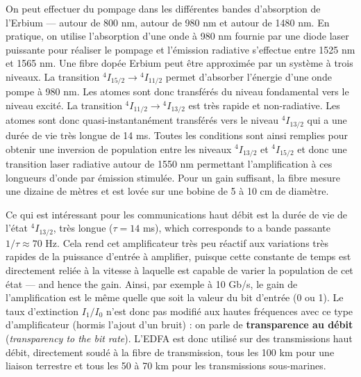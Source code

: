 \noindent On peut effectuer du pompage dans les différentes bandes
d'absorption de l'Erbium --- autour de 800 nm, autour de 980 nm et autour de
1480 nm. En pratique, on utilise l'absorption d'une onde à 980 nm fournie par
une diode laser puissante pour réaliser le pompage et l'émission radiative
s'effectue entre 1525 nm et 1565 nm. Une fibre dopée Erbium peut être
approximée par un système à trois niveaux. La transition
$^4I_{15/2}\to{}^4I_{11/2}$ permet d'absorber l'énergie d'une onde pompe à
980 nm. Les atomes sont donc transférés du niveau fondamental vers le niveau
excité. La transition $^4I_{11/2}\to{}^4I_{13/2}$ est très rapide et
non-radiative. Les atomes sont donc quasi-instantanément transférés vers le
niveau $^4I_{13/2}$ qui a une durée de vie très longue de 14 ms. Toutes les
conditions sont ainsi remplies pour obtenir une inversion de population entre
les niveaux $^4I_{13/2}$ et $^4I_{15/2}$ et donc une transition laser radiative
autour de 1550 nm permettant l'amplification à ces longueurs d'onde par
émission stimulée. Pour un gain suffisant, la fibre mesure une dizaine de
mètres et est lovée sur une bobine de 5 à 10 cm de diamètre.

\begin{conclusion}
  Ce qui est intéressant pour les communications haut débit est la durée de vie
  de l'état $^4I_{13/2}$, très longue ($\tau=14$ ms), which corresponds to a
  bande passante $1/\tau\approx 70$ Hz. Cela rend cet amplificateur très peu
  réactif aux variations très rapides de la puissance d'entrée à amplifier,
  puisque cette constante de temps est directement reliée à la vitesse à
  laquelle est capable de varier la population de cet état --- and hence the
  gain. Ainsi, par exemple à 10 Gb/s, le gain de l'amplification est le même
  quelle que soit la valeur du bit d'entrée (0 ou 1). Le taux d'extinction
  $I_1/I_0$ n'est donc pas modifié aux hautes fréquences avec ce type
  d'amplificateur (hormis l'ajout d'un bruit) : on parle de
  \textbf{transparence au débit} (\textit{transparency to the bit rate}).
  L'EDFA est donc utilisé sur des transmissions haut débit, directement soudé à
  la fibre de transmission, tous les 100 km pour une liaison terrestre et tous
  les 50 à 70 km pour les transmissions sous-marines.
\end{conclusion}

